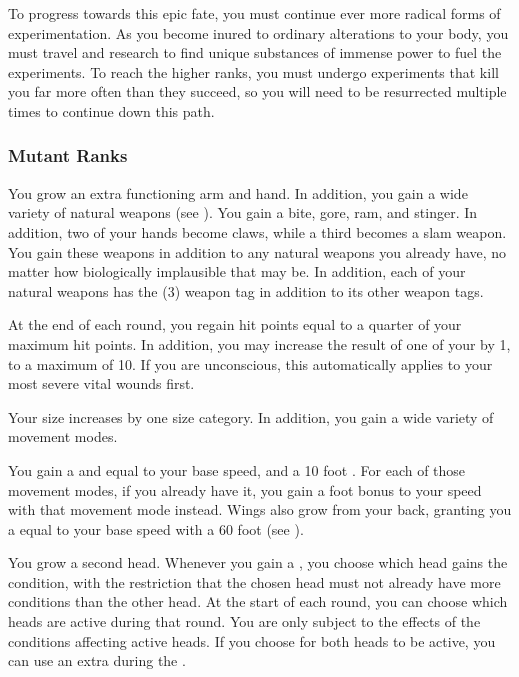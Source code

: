          To progress towards this epic fate, you must continue ever more radical forms of experimentation.
        As you become inured to ordinary alterations to your body, you must travel and research to find unique substances of immense power to fuel the experiments.
        To reach the higher ranks, you must undergo experiments that kill you far more often than they succeed, so you will need to be resurrected multiple times to continue down this path.

        \subsubsection{Mutant Ranks}
             You grow an extra functioning arm and hand.
            In addition, you gain a wide variety of natural weapons (see ).
            You gain a bite, gore, ram, and stinger.
            In addition, two of your hands become claws, while a third becomes a slam weapon.
            You gain these weapons in addition to any natural weapons you already have, no matter how biologically implausible that may be.
            In addition, each of your natural weapons has the  (3) weapon tag in addition to its other weapon tags.

             At the end of each round, you regain hit points equal to a quarter of your maximum hit points.
            In addition, you may increase the result of one of your  by 1, to a maximum of 10.
            If you are unconscious, this automatically applies to your most severe vital wounds first.

             Your size increases by one size category.
            In addition, you gain a wide variety of movement modes.

            You gain a  and  equal to your base speed, and a 10 foot .
            For each of those movement modes, if you already have it, you gain a  foot bonus to your speed with that movement mode instead.
            Wings also grow from your back, granting you a  equal to your base speed with a 60 foot  (see ).

             You grow a second head.
            Whenever you gain a , you choose which head gains the condition, with the restriction that the chosen head must not already have more conditions than the other head.
            At the start of each round, you can choose which heads are active during that round.
            You are only subject to the effects of the conditions affecting active heads.
            If you choose for both heads to be active, you can use an extra  during the .


